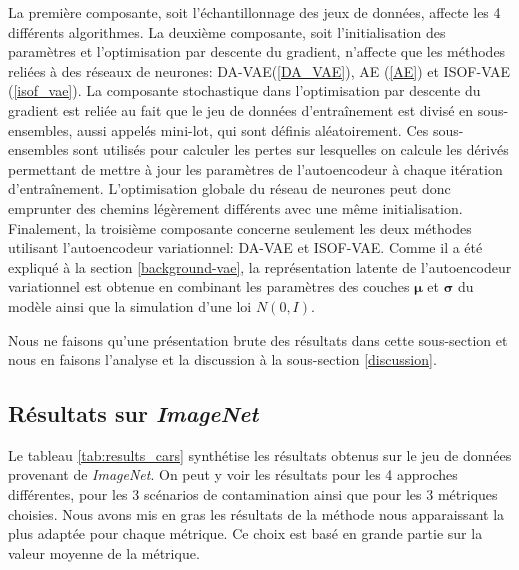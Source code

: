 La première composante, soit l'échantillonnage des jeux de données, affecte les 4 différents algorithmes. La deuxième composante, soit l'initialisation des paramètres et l'optimisation par descente du gradient, n'affecte que les méthodes reliées à des réseaux de neurones: DA-VAE(\ref{DA_VAE}), AE (\ref{AE}) et ISOF-VAE (\ref{isof_vae}). La composante stochastique dans l'optimisation par descente du gradient est reliée au fait que le jeu de données d'entraînement est divisé en sous-ensembles, aussi appelés mini-lot, qui sont définis aléatoirement. Ces sous-ensembles sont utilisés pour calculer les pertes sur lesquelles on calcule les dérivés permettant de mettre à jour les paramètres de l'autoencodeur à chaque itération d'entraînement. L'optimisation globale du réseau de neurones peut donc emprunter des chemins légèrement différents avec une même initialisation. Finalement, la troisième composante concerne seulement les deux méthodes utilisant l'autoencodeur variationnel: DA-VAE et ISOF-VAE. Comme il a été expliqué à la section \ref{background-vae}, la représentation latente de l'autoencodeur variationnel est obtenue en combinant les paramètres des couches $\boldsymbol{\mu}$ et $\boldsymbol{\sigma}$ du modèle ainsi que la simulation d'une loi $N(0,I)$.

Nous ne faisons qu'une présentation brute des résultats dans cette sous-section et nous en faisons l'analyse et la discussion à la sous-section \ref{discussion}.
  

\subsection{Résultats sur \textit{ImageNet}}

Le tableau \ref{tab:results_cars} synthétise les résultats obtenus sur le jeu de données provenant de \textit{ImageNet}. On peut y voir les résultats pour les 4 approches différentes, pour les 3 scénarios de contamination ainsi que pour les 3 métriques choisies. Nous avons mis en gras les résultats de la méthode nous apparaissant la plus adaptée pour chaque métrique. Ce choix est basé en grande partie sur la valeur moyenne de la métrique.


